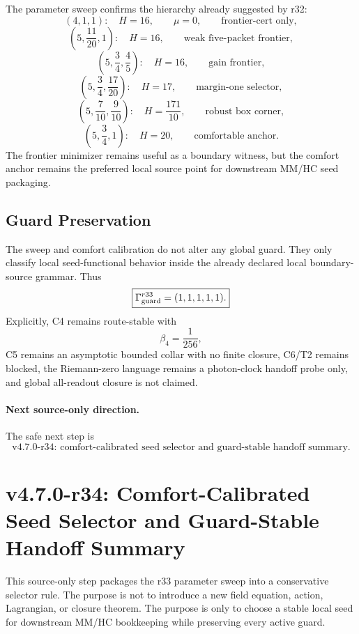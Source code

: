The parameter sweep confirms the hierarchy already suggested by r32:
\[
(4,1,1):\quad H=16,
\qquad
\mu=0,
\qquad
\text{frontier-cert only},
\]
\[
\left(5,\frac{11}{20},1\right):\quad H=16,
\qquad
\text{weak five-packet frontier},
\]
\[
\left(5,\frac34,\frac45\right):\quad H=16,
\qquad
\text{gain frontier},
\]
\[
\left(5,\frac34,\frac{17}{20}\right):\quad H=17,
\qquad
\text{margin-one selector},
\]
\[
\left(5,\frac7{10},\frac9{10}\right):\quad H=\frac{171}{10},
\qquad
\text{robust box corner},
\]
\[
\left(5,\frac34,1\right):\quad H=20,
\qquad
\text{comfortable anchor}.
\]
The frontier minimizer remains useful as a boundary witness, but the comfort
anchor remains the preferred local source point for downstream MM/HC seed
packaging.

\subsection{Guard Preservation}
\label{subsec:r33-guard-preservation}

The sweep and comfort calibration do not alter any global guard.  They only
classify local seed-functional behavior inside the already declared local
boundary-source grammar.  Thus
\[
\boxed{
\Gamma_{\rm guard}^{r33}=(1,1,1,1,1).
}
\]
Explicitly, C4 remains route-stable with
\[
\beta_4=\frac1{256},
\]
C5 remains an asymptotic bounded collar with no finite closure, C6/T2 remains
blocked, the Riemann-zero language remains a photon-clock handoff probe only,
and global all-readout closure is not claimed.

\paragraph{Next source-only direction.}
The safe next step is
\[
\boxed{
\text{v4.7.0-r34: comfort-calibrated seed selector and guard-stable handoff summary.}
}
\]



\section{v4.7.0-r34: Comfort-Calibrated Seed Selector and Guard-Stable Handoff Summary}
\label{sec:v470-r34-comfort-seed-selector-handoff}

This source-only step packages the r33 parameter sweep into a conservative
selector rule.  The purpose is not to introduce a new field equation, action,
Lagrangian, or closure theorem.  The purpose is only to choose a stable local
seed for downstream MM/HC bookkeeping while preserving every active guard.

